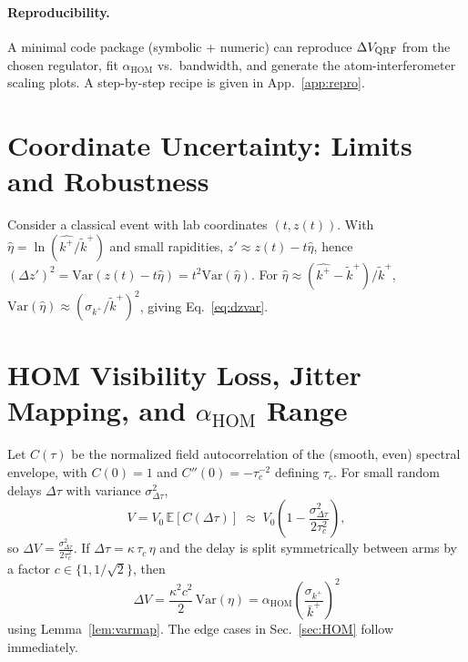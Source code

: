 \documentclass[aps,11pt]{article}
\newcommand{\Var}{\mathrm{Var}}
\newcommand{\E}{\mathbb{E}}
\newcommand{\kplus}{k^{+}}
\newcommand{\kbar}{\bar{k}^{+}}
\newcommand{\ktil}{\tilde{k}^{+}}
\newcommand{\alphahom}{\alpha_{\text{HOM}}}
\begin{document}
\paragraph{Reproducibility.} A minimal code package (symbolic + numeric) can reproduce \(\Delta V_{\rm QRF}\) from the chosen regulator, fit \(\alphahom\) vs.~bandwidth, and generate the atom-interferometer scaling plots. A step-by-step recipe is given in App.~\ref{app:repro}.

\appendix

\section{Coordinate Uncertainty: Limits and Robustness}\label{app:A}
Consider a classical event with lab coordinates \((t,z(t))\). With \(\hat\eta=\ln(\hat{\kplus}/\ktil)\) and small rapidities,
\(z'\approx z(t)-t\hat\eta\), hence
\((\Delta z')^2=\Var(z(t)-t\hat\eta)=t^2\Var(\hat\eta)\).
For \(\hat\eta\approx (\hat{\kplus}-\ktil)/\ktil\), \(\Var(\hat\eta)\approx (\sigma_{\kplus}/\ktil)^{2}\), giving Eq.~\eqref{eq:dzvar}.

\section{HOM Visibility Loss, Jitter Mapping, and \texorpdfstring{$\alphahom$}{alpha\_HOM} Range}\label{app:B}
Let \(C(\tau)\) be the normalized field autocorrelation of the (smooth, even) spectral envelope, with \(C(0)=1\) and \(C''(0)=-\tau_c^{-2}\) defining \(\tau_c\). For small random delays \(\Delta\tau\) with variance \(\sigma_{\Delta\tau}^{2}\),
\begin{equation}
V=V_0\,\E[C(\Delta\tau)]\;\approx\; V_0\!\left(1-\frac{\sigma_{\Delta\tau}^{2}}{2\tau_c^{2}}\right),
\end{equation}
so \(\Delta V=\frac{\sigma_{\Delta\tau}^{2}}{2\tau_c^{2}}\). If \(\Delta\tau=\kappa\,\tau_c\,\eta\) and the delay is split symmetrically between arms by a factor \(c\in\{1,1/\sqrt2\}\), then
\begin{equation}
\Delta V=\frac{\kappa^2 c^2}{2}\,\Var(\eta)=\alphahom\left(\frac{\sigma_{\kplus}}{\kbar}\right)^{2}
\end{equation}
using Lemma~\ref{lem:varmap}. The edge cases in Sec.~\ref{sec:HOM} follow immediately.
\end{document}
